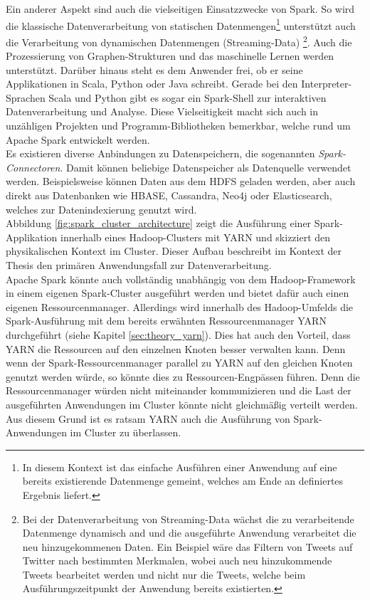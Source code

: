 \noindent
Ein anderer Aspekt sind auch die vielseitigen Einsatzzwecke von Spark. So wird die klassische Datenverarbeitung von statischen Datenmengen\footnote{In diesem Kontext ist das einfache Ausführen einer Anwendung auf eine bereits existierende Datenmenge gemeint, welches am Ende an definiertes Ergebnis liefert.} unterstützt auch die Verarbeitung von dynamischen Datenmengen (Streaming-Data) \footnote{Bei der Datenverarbeitung von Streaming-Data wächst die zu verarbeitende Datenmenge dynamisch and und die ausgeführte Anwendung verarbeitet die neu hinzugekommenen Daten. Ein Beispiel wäre das Filtern von Tweets auf Twitter nach bestimmten Merkmalen, wobei auch neu hinzukommende Tweets bearbeitet werden und nicht nur die Tweets, welche beim Ausführungszeitpunkt der Anwendung bereits existierten.}. Auch die Prozessierung von Graphen-Strukturen und das maschinelle Lernen werden unterstützt.\cite[S. 152]{expert_hadoop_admin}
Darüber hinaus steht es dem Anwender frei, ob er seine Applikationen in Scala, Python oder Java schreibt. Gerade bei den Interpreter-Sprachen Scala und Python gibt es sogar ein Spark-Shell zur interaktiven Datenverarbeitung und Analyse. Diese Vielseitigkeit macht sich auch in unzähligen Projekten und Programm-Bibliotheken bemerkbar, welche rund um Apache Spark entwickelt werden.\\ 
Es existieren diverse Anbindungen zu Datenspeichern, die sogenannten \textit{Spark-Connectoren}. Damit können beliebige Datenspeicher als Datenquelle verwendet werden.
Beispielsweise können Daten aus dem HDFS geladen werden, aber auch direkt aus Datenbanken wie HBASE, Cassandra, Neo4j oder Elasticsearch, welches zur Datenindexierung genutzt wird.  \\

\noindent
Abbildung \ref{fig:spark_cluster_architecture} zeigt die Ausführung einer Spark-Applikation innerhalb eines Hadoop-Clusters mit YARN und skizziert den physikalischen Kontext im Cluster. Dieser Aufbau beschreibt im Kontext der Thesis den primären Anwendungsfall zur Datenverarbeitung.\\ 
Apache Spark könnte auch vollständig unabhängig von dem Hadoop-Framework in einem eigenen Spark-Cluster ausgeführt werden und bietet dafür auch einen eigenen Ressourcenmanager. Allerdings wird innerhalb des Hadoop-Umfelds die Spark-Ausführung mit dem bereits erwähnten Ressourcenmanager YARN durchgeführt (siehe Kapitel \ref{sec:theory_yarn}). Dies hat auch
den Vorteil, dass YARN die Ressourcen auf den einzelnen Knoten besser verwalten kann. Denn wenn der Spark-Ressourcenmanager parallel zu YARN auf den gleichen Knoten genutzt werden würde, so könnte dies zu Ressourcen-Engpässen führen. Denn die Ressourcenmanager würden nicht miteinander kommunizieren und die Last der ausgeführten Anwendungen im Cluster könnte nicht gleichmäßig verteilt werden. Aus diesem Grund ist es ratsam YARN auch die Ausführung von Spark-Anwendungen im Cluster zu überlassen.\\


